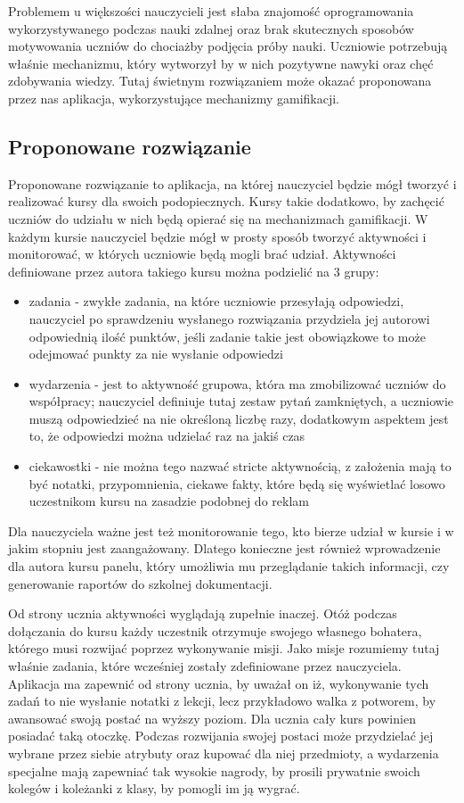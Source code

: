 Problemem u większości nauczycieli jest słaba znajomość oprogramowania 
wykorzystywanego podczas nauki zdalnej oraz brak skutecznych sposobów motywowania 
uczniów do chociażby podjęcia próby nauki. Uczniowie potrzebują właśnie mechanizmu, 
który wytworzył by w nich pozytywne nawyki oraz chęć zdobywania wiedzy. Tutaj 
świetnym rozwiązaniem może okazać proponowana przez nas aplikacja, wykorzystujące 
mechanizmy gamifikacji. 

\subsection{Proponowane rozwiązanie}

Proponowane rozwiązanie to aplikacja, na której nauczyciel będzie mógł  tworzyć i realizować kursy dla swoich podopiecznych. Kursy takie dodatkowo, by  zachęcić uczniów do udziału w nich będą opierać się na mechanizmach gamifikacji. 
W każdym kursie nauczyciel będzie mógł w prosty sposób tworzyć aktywności i monitorować, w których uczniowie będą mogli brać udział. Aktywności definiowane przez autora takiego kursu można podzielić na 3 grupy:
\begin{itemize}
\item zadania - zwykłe zadania, na które uczniowie przesyłają odpowiedzi, nauczyciel 
po sprawdzeniu wysłanego rozwiązania przydziela jej autorowi odpowiednią ilość punktów, 
jeśli zadanie takie jest obowiązkowe to może odejmować punkty za nie wysłanie odpowiedzi
\item wydarzenia - jest to aktywność grupowa, która ma zmobilizować uczniów do współpracy; 
nauczyciel definiuje tutaj zestaw pytań zamkniętych, a uczniowie muszą odpowiedzieć na 
nie określoną liczbę razy, dodatkowym aspektem jest to, że odpowiedzi można udzielać 
raz na jakiś czas
\item ciekawostki - nie można tego nazwać stricte aktywnością, z założenia mają to być 
notatki, przypomnienia, ciekawe fakty, które będą się wyświetlać losowo uczestnikom kursu 
na zasadzie podobnej do reklam
\end{itemize}
Dla nauczyciela ważne jest też monitorowanie tego, kto bierze udział w kursie i w 
jakim stopniu jest zaangażowany. Dlatego konieczne jest również wprowadzenie dla autora 
kursu panelu, który umożliwia mu przeglądanie takich informacji, czy generowanie raportów 
do szkolnej dokumentacji. 

Od strony ucznia aktywności wyglądają zupełnie inaczej. Otóż podczas dołączania do 
kursu każdy uczestnik otrzymuje swojego własnego bohatera, którego musi rozwijać 
poprzez wykonywanie misji. Jako misje rozumiemy tutaj właśnie zadania, które wcześniej 
zostały zdefiniowane przez nauczyciela. Aplikacja ma zapewnić od strony ucznia, by uważał 
on iż, wykonywanie tych zadań to nie wysłanie notatki z lekcji, lecz przykładowo walka z 
potworem, by awansować swoją postać na wyższy poziom. Dla ucznia cały kurs powinien posiadać 
taką otoczkę. Podczas rozwijania swojej postaci może przydzielać jej wybrane przez siebie 
atrybuty oraz kupować dla niej przedmioty, a wydarzenia specjalne mają zapewniać tak wysokie 
nagrody, by prosili prywatnie swoich kolegów i koleżanki z klasy, by pomogli im ją wygrać. 

